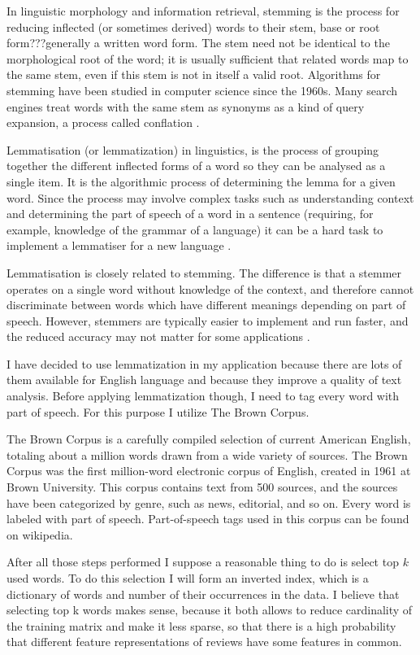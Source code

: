 \documentclass[12pt]{report}
\begin{document}
In linguistic morphology and information retrieval, stemming is the process for reducing inflected (or sometimes derived) words to their stem, base or root form???generally a written word form. The stem need not be identical to the morphological root of the word; it is usually sufficient that related words map to the same stem, even if this stem is not in itself a valid root. Algorithms for stemming have been studied in computer science since the 1960s. Many search engines treat words with the same stem as synonyms as a kind of query expansion, a process called conflation \cite{Wake}.

Lemmatisation (or lemmatization) in linguistics, is the process of grouping together the different inflected forms of a word so they can be analysed as a single item. 
It is the algorithmic process of determining the lemma for a given word. Since the process may involve complex tasks such as understanding context and determining the part of speech of a word in a sentence (requiring, for example, knowledge of the grammar of a language) it can be a hard task to implement a lemmatiser for a new language \cite{Wake}.

Lemmatisation is closely related to stemming. The difference is that a stemmer operates on a single word without knowledge of the context, and therefore cannot discriminate between words which have different meanings depending on part of speech. However, stemmers are typically easier to implement and run faster, and the reduced accuracy may not matter for some applications \cite{potts}.

I have decided to use lemmatization in my application because there are lots of them available for English language and because they improve a quality of text analysis. Before applying lemmatization though, I need to tag every word with part of speech. For this purpose I utilize The Brown Corpus.

The Brown Corpus is a carefully compiled selection of current American English, totaling about a million words drawn from a wide variety of sources. The Brown Corpus was the first million-word electronic corpus of English, created in 1961 at Brown University. This corpus contains text from 500 sources, and the sources have been categorized by genre, such as news, editorial, and so on. Every word is labeled with part of speech. Part-of-speech tags used in this corpus can be found on wikipedia.

After all those steps performed I suppose a reasonable thing to do is select top $k$ used words. To do this selection I will form an inverted index, which is a dictionary of words and number of their occurrences in the data. I believe that selecting top k words makes sense, because it both allows to reduce cardinality of the training matrix and make it less sparse, so that there is a high probability that different feature representations of reviews have some features in common.
\end{document}
